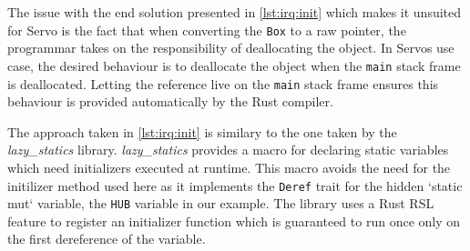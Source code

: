 The issue with the end solution presented in \autoref{lst:irq:init} which makes it unsuited for Servo is the fact that when converting the \texttt{Box} to a raw pointer, the programmar takes on the responsibility of deallocating the object.
In Servos use case, the desired behaviour is to deallocate the object when the \texttt{main} stack frame is deallocated.
Letting the reference live on the \texttt{main} stack frame ensures this behaviour is provided automatically by the Rust compiler.

The approach taken in \autoref{lst:irq:init} is similary to the one taken by the \textit{lazy_statics} \cite{web:lazy_statics} library.
\textit{lazy_statics} provides a macro for declaring static variables which need initializers executed at runtime.
This macro avoids the need for the initilizer method used here as it implements the \texttt{Deref} trait for the hidden `static mut` variable, the \texttt{HUB} variable in our example.
The library uses a Rust RSL feature to register an initializer function which is guaranteed to run once only on the first dereference of the variable.
